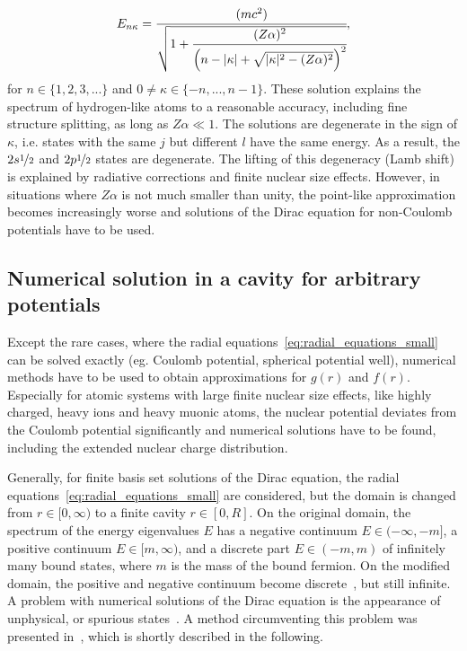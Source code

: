 \begin{equation}
\label{eq:finestructure_formula}
E_{n\kappa}=\cfrac{(mc^2)}{\sqrt{1+\cfrac{(Z\alpha)^2}{\left( n-|\kappa|+\sqrt{|\kappa|^2-(Z\alpha)^2} \right)^2}}},
\end{equation}
for $n\in \{1,2,3,...\}$ and $0\neq \kappa \in \{{-}{n},...,n-1\}$.
These solution explains the spectrum of hydrogen-like atoms to a reasonable accuracy, including fine structure splitting, as long as $Z\alpha\ll 1$. The solutions are degenerate in the sign of $\kappa$, i.e. states with the same $j$ but different $l$ have the same energy. As a result, the $2s\nicefrac{1}{2}$ and $2p\nicefrac{1}{2}$ states are degenerate. The lifting of this degeneracy (Lamb shift) is explained by radiative corrections and finite nuclear size effects. However, in situations where $Z\alpha$ is not much smaller than unity, the point-like approximation becomes increasingly worse and solutions of the Dirac equation for non-Coulomb potentials have to be used.



\subsection{Numerical solution in a cavity for arbitrary potentials}
Except the rare cases, where the radial equations~\eqref{eq:radial_equations_small} can be solved exactly (eg. Coulomb potential, spherical potential well), numerical methods have to be used to obtain approximations for $g(r)$ and $f(r)$. Especially for atomic systems with large finite nuclear size effects, like highly charged, heavy ions and heavy muonic atoms, the nuclear potential deviates from the Coulomb potential significantly and numerical solutions have to be found, including the extended nuclear charge distribution.
 
Generally, for finite basis set solutions of the Dirac equation, the radial equations~\eqref{eq:radial_equations_small} are considered, but the domain is changed from $r\in[0,\infty)$ to a finite cavity $r\in [0,R]$. On the original domain, the spectrum of the energy eigenvalues $E$ has a negative continuum $E\in (-\infty,-m]$, a positive continuum $E\in [m,\infty)$, and a discrete part $E\in (-m,m)$ of infinitely many bound states, where $m$ is the mass of the bound fermion. On the modified domain, the positive and negative continuum become discrete~\cite{johnson1988}, but still infinite.
A problem with numerical solutions of the Dirac equation is the appearance of unphysical, or spurious states~\cite{johnson1988, drake1981}. A method circumventing this problem was presented in~\cite{Shabaev2004}, which is shortly described in the following.

